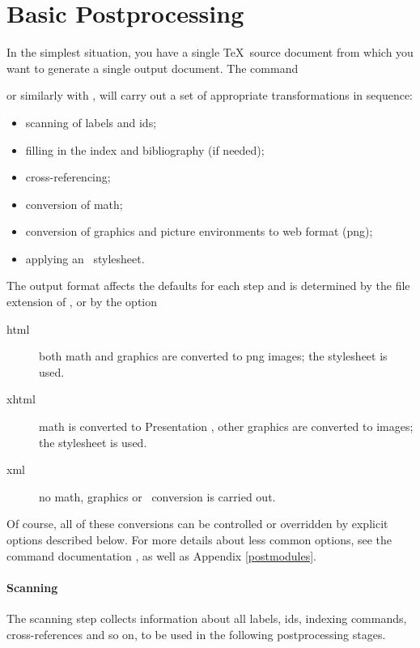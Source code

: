 \documentclass{book}
\begin{document}
\section[Postprocessing]{Basic Postprocessing}\label{usage.single}
In the simplest situation, you have a single \TeX\ source document
from which you want to generate a single output document.
The command
\begin{quote}
\end{quote}
or similarly with ,
will carry out a set of appropriate transformations in sequence:
\begin{itemize}
  \item scanning of labels and ids;
  \item filling in the index and bibliography (if needed);
  \item cross-referencing;
  \item conversion of math;
  \item conversion of graphics and picture environments to web format (png);
  \item applying an \XSLT\ stylesheet.
\end{itemize}
The output format affects the defaults for each step and is determined
by the file extension of , or by the option
\begin{quote}
\end{quote}
\begin{description}
 \item[html] both math and graphics are converted to png images;
    the stylesheet  is used.
 \item[xhtml] math is converted to Presentation \MathML, other graphics are converted to images;
    the stylesheet   is used.
 \item[xml] no math, graphics or \XSLT\ conversion is carried out.
\end{description}
Of course, all of these conversions can be controlled or overridden
by explicit options described below.
For more details about less common options, see the command
documentation , as well as Appendix \ref{postmodules}.

\paragraph{Scanning}
The scanning step collects information about all labels, ids,
indexing commands, cross-references and so on, to be used
in the following postprocessing stages.
\end{document}
